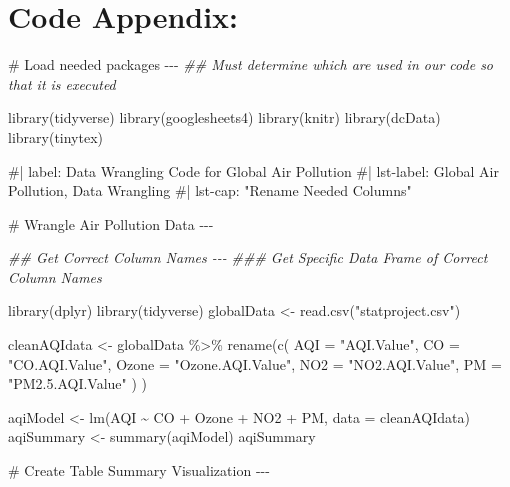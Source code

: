 \documentclass[
  letterpaper,
  DIV=11,
  numbers=noendperiod]{scrartcl}
\newenvironment{Shaded}{\begin{snugshade}}{\end{snugshade}}
\newcommand{\AttributeTok}[1]{\textcolor[rgb]{0.40,0.45,0.13}{#1}}
\newcommand{\CommentTok}[1]{\textcolor[rgb]{0.37,0.37,0.37}{#1}}
\newcommand{\DocumentationTok}[1]{\textcolor[rgb]{0.37,0.37,0.37}{\textit{#1}}}
\newcommand{\FunctionTok}[1]{\textcolor[rgb]{0.28,0.35,0.67}{#1}}
\newcommand{\NormalTok}[1]{\textcolor[rgb]{0.00,0.23,0.31}{#1}}
\newcommand{\OtherTok}[1]{\textcolor[rgb]{0.00,0.23,0.31}{#1}}
\newcommand{\SpecialCharTok}[1]{\textcolor[rgb]{0.37,0.37,0.37}{#1}}
\newcommand{\StringTok}[1]{\textcolor[rgb]{0.13,0.47,0.30}{#1}}
\begin{document}
\section{Code Appendix:}\label{code-appendix}

\begin{Shaded}
\begin{Highlighting}[]
\CommentTok{\# Load needed packages {-}{-}{-}}
\DocumentationTok{\#\# Must determine which are used in our code so that it is executed}


\FunctionTok{library}\NormalTok{(tidyverse)}
\FunctionTok{library}\NormalTok{(googlesheets4)}
\FunctionTok{library}\NormalTok{(knitr)}
\FunctionTok{library}\NormalTok{(dcData)}
\FunctionTok{library}\NormalTok{(tinytex)}

\CommentTok{\#| label: Data Wrangling Code for Global Air Pollution}
\CommentTok{\#| lst{-}label: Global Air Pollution, Data Wrangling}
\CommentTok{\#| lst{-}cap: "Rename Needed Columns"}


\CommentTok{\# Wrangle Air Pollution Data {-}{-}{-}}

\DocumentationTok{\#\# Get Correct Column Names {-}{-}{-}}
\DocumentationTok{\#\#\# Get Specific Data Frame of Correct Column Names}

\FunctionTok{library}\NormalTok{(dplyr)}
\FunctionTok{library}\NormalTok{(tidyverse)}
\NormalTok{globalData }\OtherTok{\textless{}{-}} \FunctionTok{read.csv}\NormalTok{(}\StringTok{"statproject.csv"}\NormalTok{)}

\NormalTok{cleanAQIdata }\OtherTok{\textless{}{-}}\NormalTok{ globalData }\SpecialCharTok{\%\textgreater{}\%}
  \FunctionTok{rename}\NormalTok{(}\FunctionTok{c}\NormalTok{(}
    \AttributeTok{AQI =} \StringTok{"AQI.Value"}\NormalTok{,}
    \AttributeTok{CO =} \StringTok{"CO.AQI.Value"}\NormalTok{,}
    \AttributeTok{Ozone =} \StringTok{"Ozone.AQI.Value"}\NormalTok{,}
    \AttributeTok{NO2 =} \StringTok{"NO2.AQI.Value"}\NormalTok{,}
    \AttributeTok{PM =} \StringTok{"PM2.5.AQI.Value"}
\NormalTok{    )}
\NormalTok{    )}

\NormalTok{aqiModel }\OtherTok{\textless{}{-}} \FunctionTok{lm}\NormalTok{(AQI }\SpecialCharTok{\textasciitilde{}}\NormalTok{ CO }\SpecialCharTok{+}\NormalTok{ Ozone }\SpecialCharTok{+}\NormalTok{ NO2 }\SpecialCharTok{+}\NormalTok{ PM, }\AttributeTok{data =}\NormalTok{ cleanAQIdata)}
\NormalTok{aqiSummary }\OtherTok{\textless{}{-}} \FunctionTok{summary}\NormalTok{(aqiModel)}
\NormalTok{aqiSummary}

\CommentTok{\# Create Table Summary Visualization {-}{-}{-}}


\end{Highlighting}
\end{Shaded}
\end{document}
